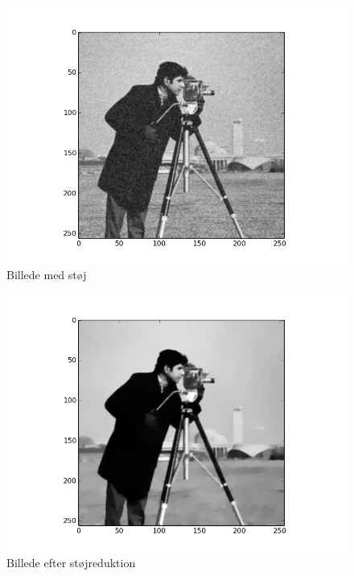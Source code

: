 \documentclass[12pt, a4paper]{article}
\begin{document}
\begin{figure}[H]
  \caption{Billede med støj}
  \centering
	\includegraphics[scale=0.8]{darealest}
\end{figure}
\begin{figure}[H]
  \caption{Billede efter støjreduktion}
  \centering
	\includegraphics[scale=0.8]{smoothim}
\end{figure}
\end{document}
